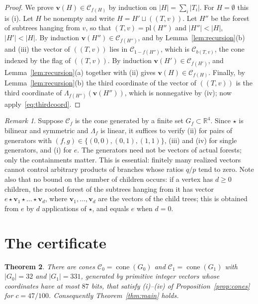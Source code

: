 \documentclass{amsart}
\numberwithin{equation}{section}
\theoremstyle{plain}
\newtheorem{theorem}{Theorem}[section]
\theoremstyle{definition}
\theoremstyle{remark}
\newtheorem{remark}[theorem]{Remark}
\newcommand{\R}{\mathbb{R}}
\newcommand{\C}{\mathcal{C}}
\newcommand{\vc}{\mathbf{v}}
\begin{document}
\begin{proof}
We prove $\vc(H)\in\C_{f(H)}$ by induction on $|H|=\sum_i|T_i|$. For $H=\emptyset$ this is (i). Let $H$ be nonempty and write $H=H'\sqcup((T,v))$. Let $H''$ be the forest of subtrees hanging from $v$, so that $(T,v)=\mathrm{pl}(H'')$ and $|H''|<|H|$, $|H'|<|H|$. By induction $\vc(H'')\in\C_{f(H'')}$, and by Lemma~\ref{lem:recursion}(b) and (iii) the vector of $((T,v))$ lies in $\C_{1-f(H'')}$, which is $\C_{b(T,v)}$, the cone indexed by the flag of $((T,v))$. By induction $\vc(H')\in\C_{f(H')}$, and Lemma~\ref{lem:recursion}(a) together with (ii) gives $\vc(H)\in\C_{f(H)}$. Finally, by Lemma~\ref{lem:recursion}(b) the third coordinate of the vector of $((T,v))$ is the third coordinate of $\Lambda_{f(H'')}(\vc(H''))$, which is nonnegative by (iv); now apply~\eqref{eq:thirdcoord}.
\end{proof}

\begin{remark}\label{rem:finite}
Suppose $\C_f$ is the cone generated by a finite set $G_f\subset\R^4$. Since $\star$ is bilinear and symmetric and $\Lambda_f$ is linear, it suffices to verify (ii) for pairs of generators with $(f,g)\in\{(0,0),(0,1),(1,1)\}$, (iii) and (iv) for single generators, and (i) for $e$. The generators need not be vectors of actual forests; only the containments matter. This is essential: finitely many realized vectors cannot control arbitrary products of branches whose ratios $q/p$ tend to zero. Note also that no bound on the number of children occurs: if a vertex has $d\ge0$ children, the rooted forest of the subtrees hanging from it has vector $e\star\vc_1\star\dots\star\vc_d$, where $\vc_1,\dots,\vc_d$ are the vectors of the child trees; this is obtained from $e$ by $d$ applications of $\star$, and equals $e$ when $d=0$.
\end{remark}

\section{The certificate}\label{sec:cert}

\begin{theorem}\label{thm:cones}
There are cones $\C_0=\operatorname{cone}(G_0)$ and $\C_1=\operatorname{cone}(G_1)$ with $|G_0|=32$ and $|G_1|=331$, generated by primitive integer vectors whose coordinates have at most $87$ bits, that satisfy \textup{(i)--(iv)} of Proposition~\textup{\ref{prop:cones}} for $c=47/100$. Consequently Theorem~\textup{\ref{thm:main}} holds.
\end{theorem}
\end{document}
